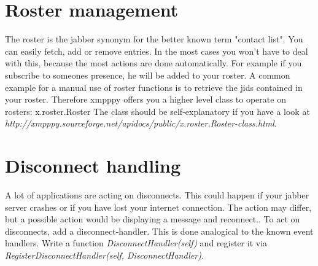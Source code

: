 \section{Roster management}
The roster is the jabber synonym for the better known term "contact list". You can easily fetch, add or remove entries.
In the most cases you won't have to deal with this, because the most actions are done automatically.
For example if you subscribe to someones presence, he will be added to your roster.
A common example for a manual use of roster functions is to retrieve the jids contained in your roster.
\newline
Therefore xmpppy offers you a higher level class to operate on rosters: x.roster.Roster
\newline
The class should be self-explanatory if you have a look at
\newline \textit{http://xmpppy.sourceforge.net/apidocs/public/x.roster.Roster-class.html}.

\section{Disconnect handling}

A lot of applications are acting on disconnects. This could happen if your jabber server crashes or if you have lost your internet connection. The action may differ, but a possible action would be displaying a message and reconnect..
To act on disconnects, add a disconnect-handler. This is done analogical to the known event handlers.
Write a function \textit{DisconnectHandler(self)} and register it via \textit{RegisterDisconnectHandler(self, DisconnectHandler)}.







